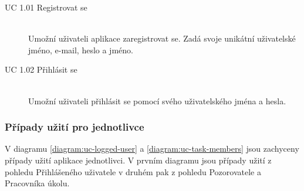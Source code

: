 \documentclass[thesis=B,czech]{FITthesis}[2012/06/26]
\begin{document}
			\begin{description}
				\item[UC 1.01 Registrovat se] \hfill \\
					Umožní uživateli aplikace zaregistrovat se. Zadá svoje unikátní uživatelské jméno, e-mail, heslo a jméno.
					
				\item[UC 1.02 Přihlásit se] \hfill \\
					Umožní uživateli přihlásit se pomocí svého uživatelského jména a hesla.	
					
			\end{description}
		
		
			\subsubsection{Případy užití pro jednotlivce}	
			V diagramu \ref{diagram:uc-logged-user} a \ref{diagram:uc-task-members} jsou zachyceny případy užití aplikace jednotlivci. V prvním diagramu jsou případy užití z pohledu Přihlášeného uživatele v druhém pak z pohledu Pozorovatele a Pracovníka úkolu.
			
			
			
\end{document}
